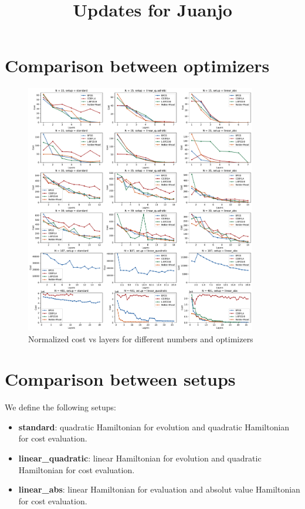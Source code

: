 \documentclass[12pt, letterpaper]{article}
\title{Updates for Juanjo}
\date{}
\begin{document}
\section{Comparison between optimizers}

\begin{figure}[h]
    \centering
    \includegraphics[width=0.9\textwidth]{methods_comparison.pdf}
    \caption{Normalized cost vs layers for different numbers and optimizers}
\end{figure}


\pagebreak
\section{Comparison between setups}
We define the following setups:
\begin{itemize}
    \item \textbf{standard}: quadratic Hamiltonian for evolution and quadratic Hamiltonian for cost evaluation.
    \item \textbf{linear\_quadratic}: linear Hamiltonian for evolution and quadratic Hamiltonian for cost evaluation.
    \item \textbf{linear\_abs}: linear Hamiltonian for evaluation and absolut value Hamiltonian for cost evaluation.
\end{itemize}
\end{document}

